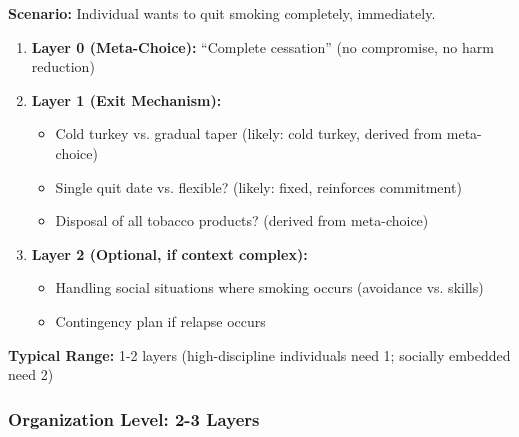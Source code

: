 \documentclass[11pt, a4paper]{article}
\begin{document}
\begin{tcolorbox}[colback=gray!5!white, colframe=gray!75!black, title=Example: Smoking Cessation via Complete Exit]

\textbf{Scenario:} Individual wants to quit smoking completely, immediately.

\begin{enumerate}
    \item \textbf{Layer 0 (Meta-Choice):} ``Complete cessation'' (no compromise, no harm reduction)

    \item \textbf{Layer 1 (Exit Mechanism):}
    \begin{itemize}[nosep]
        \item Cold turkey vs. gradual taper (likely: cold turkey, derived from meta-choice)
        \item Single quit date vs. flexible? (likely: fixed, reinforces commitment)
        \item Disposal of all tobacco products? (derived from meta-choice)
    \end{itemize}

    \item \textbf{Layer 2 (Optional, if context complex):}
    \begin{itemize}[nosep]
        \item Handling social situations where smoking occurs (avoidance vs. skills)
        \item Contingency plan if relapse occurs
    \end{itemize}
\end{enumerate}

\textbf{Typical Range:} 1-2 layers (high-discipline individuals need 1; socially embedded need 2)

\end{tcolorbox}

\subsubsection{Organization Level: 2-3 Layers}
\end{document}
